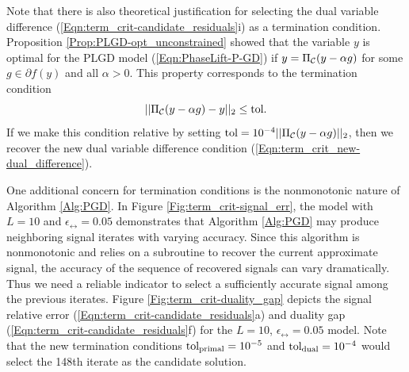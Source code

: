 Note that there is also theoretical justification for selecting the dual variable difference (\ref{Eqn:term_crit-candidate_residuals}i) as a termination condition.  Proposition \ref{Prop:PLGD-opt_unconstrained} showed that the variable $y$ is optimal for the PLGD model (\ref{Eqn:PhaseLift-P-GD}) if $y = \Pi_{\mathcal C}(y - \alpha g)$ for some $g \in \partial f(y)$ and all $\alpha > 0$.  This property corresponds to the termination condition 
\begin{equation*}
|| \Pi_{\mathcal C}(y - \alpha g) - y ||_2 \leq \text{tol}.
\end{equation*}
If we make this condition relative by setting $\text{tol} = 10^{-4}||\Pi_{\mathcal C}(y - \alpha g)||_2$, then we recover the new dual variable difference condition (\ref{Eqn:term_crit_new-dual_difference}).






One additional concern for termination conditions is the nonmonotonic nature of Algorithm \ref{Alg:PGD}.  In Figure \ref{Fig:term_crit-signal_err}, the model with $L = 10$ and $\epsilon_\rel = 0.05$ demonstrates that Algorithm \ref{Alg:PGD} may produce neighboring signal iterates with varying accuracy.  Since this algorithm is nonmonotonic and relies on a subroutine to recover the current approximate signal, the accuracy of the sequence of recovered signals can vary dramatically.  Thus we need a reliable indicator to select a sufficiently accurate signal among the previous iterates.  Figure \ref{Fig:term_crit-duality_gap} depicts the signal relative error (\ref{Eqn:term_crit-candidate_residuals}a) and duality gap (\ref{Eqn:term_crit-candidate_residuals}f) for the $L = 10$, $\epsilon_\rel = 0.05$ model.  Note that the new termination conditions $\textnormal{tol}_\text{primal} = 10^{-5}$ and $\textnormal{tol}_\text{dual} = 10^{-4}$ would select the 148th iterate as the candidate solution.  



